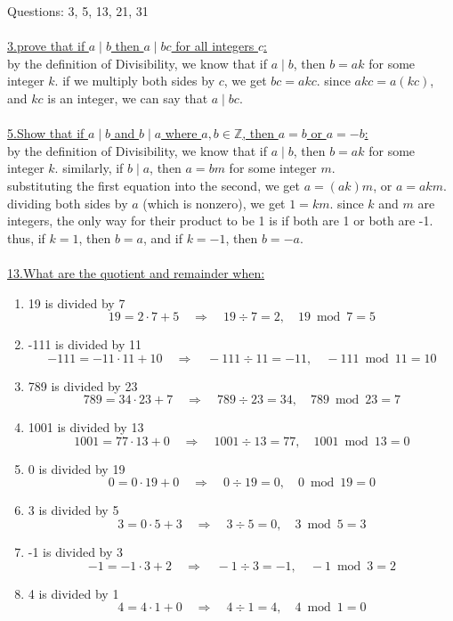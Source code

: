 \documentclass[12pt]{article}
\begin{document}
Questions: 3, 5, 13, 21, 31
\\\\
\underline{3.prove that if $a \mid b$ then $a \mid bc$ for all integers $c$:}
\\\indent by the definition of Divisibility, we know that if $a \mid b$, then $b = ak$ for some integer $k$.
 if we multiply both sides by $c$, we get $bc = akc$.
 since $akc = a(kc)$, and $kc$ is an integer, we can say that $a \mid bc$.   
\\\\
\underline{5.Show that if $a \mid b$ and $b\mid a$ where $a,b \in \mathbb{Z}$, then $a=b$ or $a=-b$:}
\\\indent by the definition of Divisibility, we know that if $a \mid b$, then $b = ak$ for some integer $k$.
 similarly, if $b \mid a$, then $a = bm$ for some integer $m$.
 \\substituting the first equation into the second, we get $a = (ak)m$, or $a = akm$.
 dividing both sides by $a$ (which is nonzero), we get $1 = km$.
 since $k$ and $m$ are integers, the only way for their product to be 1 is if both are 1 or both are -1.
 thus, if $k=1$, then $b=a$, and if $k=-1$, then $b=-a$.
\\\\
\underline{13.What are the quotient and remainder when:}
\begin{enumerate}[label=(\alph*)]
    \item 19 is divided by 7
    \[
    19 = 2 \cdot 7 + 5 \quad \Rightarrow \quad 19 \div 7 = 2, \quad 19 \bmod 7 = 5
    \]
    \item -111 is divided by 11
    \[
    -111 = -11 \cdot 11 + 10 \quad \Rightarrow \quad -111 \div 11 = -11, \quad -111 \bmod 11 = 10
    \]
    \item 789 is divided by 23
    \[
    789 = 34 \cdot 23 + 7 \quad \Rightarrow \quad 789 \div 23 = 34, \quad 789 \bmod 23 = 7
    \]
    \item 1001 is divided by 13
    \[
    1001 = 77 \cdot 13 + 0 \quad \Rightarrow \quad 1001 \div 13 = 77, \quad 1001 \bmod 13 = 0
    \]
    \item 0 is divided by 19
    \[
    0 = 0 \cdot 19 + 0 \quad \Rightarrow \quad 0 \div 19 = 0, \quad 0 \bmod 19 = 0
    \]
    \item 3 is divided by 5
    \[
    3 = 0 \cdot 5 + 3 \quad \Rightarrow \quad 3 \div 5 = 0, \quad 3 \bmod 5 = 3
    \]
    \item -1 is divided by 3
    \[
    -1 = -1 \cdot 3 + 2 \quad \Rightarrow \quad -1 \div 3 = -1, \quad -1 \bmod 3 = 2
    \]
    \item 4 is divided by 1
    \[
    4 = 4 \cdot 1 + 0 \quad \Rightarrow \quad 4 \div 1 = 4, \quad 4 \bmod 1 = 0
    \]
\end{enumerate}
\end{document}
